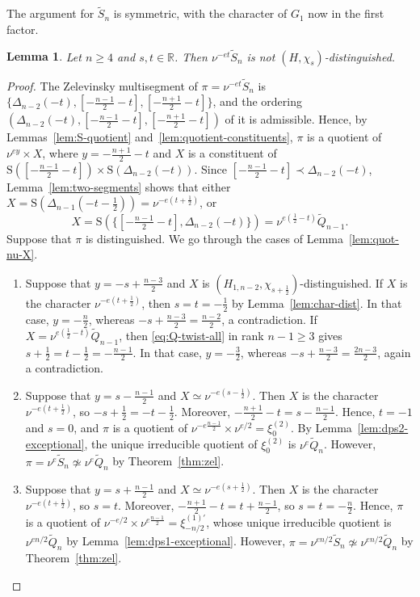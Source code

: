 \documentclass[11pt]{amsart}
\numberwithin{equation}{section}
\theoremstyle{plain}
\newtheorem{lemma}[theorem]{Lemma}
\theoremstyle{definition}
\theoremstyle{remark}
\newcommand{\R}{\mathbb{R}}
\newcommand{\Qt}{\widetilde{Q}}
\newcommand{\Stil}{\widetilde{S}}
\newcommand{\xitwo}{\xi^{(2)}}
\newcommand{\Ss}{\mathrm{S}}
\begin{document}
The argument for $\Stil_n$ is symmetric, with the character of $G_1$ now in the first factor.

\begin{lemma}\label{lem:Stn-not-dist}
	Let $n\ge4$ and $s,t\in\R$. Then $\nu^{-et}\Stil_n$ is not $(H,\chi_s)$-distinguished.
\end{lemma}

\begin{proof}
	The Zelevinsky multisegment of $\pi=\nu^{-et}\Stil_n$ is $\{\Delta_{n-2}(-t),[-\frac{n-1}2-t],[-\frac{n+1}2-t]\}$, and the ordering $(\Delta_{n-2}(-t),[-\frac{n-1}2-t],[-\frac{n+1}2-t])$ of it is admissible. Hence, by Lemmas~\ref{lem:S-quotient} and~\ref{lem:quotient-constituents}, $\pi$ is a quotient of $\nu^{ey}\times X$, where $y=-\frac{n+1}2-t$ and $X$ is a constituent of $\Ss([-\frac{n-1}2-t])\times\Ss(\Delta_{n-2}(-t))$. Since $[-\frac{n-1}2-t]\prec\Delta_{n-2}(-t)$, Lemma~\ref{lem:two-segments} shows that either $X=\Ss(\Delta_{n-1}(-t-\frac12))=\nu^{-e(t+\frac12)}$, or
	$$X=\Ss(\{[-\tfrac{n-1}2-t],\Delta_{n-2}(-t)\})=\nu^{e(\frac12-t)}\Qt_{n-1}.$$
	Suppose that $\pi$ is distinguished. We go through the cases of Lemma~\ref{lem:quot-nu-X}.
	\begin{enumerate}[label=(\alph*)]
		\item Suppose that $y=-s+\frac{n-3}2$ and $X$ is $(H_{1,n-2},\chi_{s+\frac12})$-distinguished. If $X$ is the character $\nu^{-e(t+\frac12)}$, then $s=t=-\frac12$ by Lemma~\ref{lem:char-dist}. In that case, $y=-\frac n2$, whereas $-s+\frac{n-3}2=\frac{n-2}2$, a contradiction. If $X=\nu^{e(\frac12-t)}\Qt_{n-1}$, then \eqref{eq:Q-twist-all} in rank $n-1\ge3$ gives $s+\frac12=t-\frac12=-\frac{n-1}2$. In that case, $y=-\frac32$, whereas $-s+\frac{n-3}2=\frac{2n-3}2$, again a contradiction.
		\item Suppose that $y=s-\frac{n-1}2$ and $X\simeq\nu^{-e(s-\frac12)}$. Then $X$ is the character $\nu^{-e(t+\frac12)}$, so $-s+\frac12=-t-\frac12$. Moreover, $-\frac{n+1}2-t=s-\frac{n-1}2$. Hence, $t=-1$ and $s=0$, and $\pi$ is a quotient of $\nu^{-e\frac{n-1}2}\times\nu^{e/2}=\xitwo_0$. By Lemma~\ref{lem:dps2-exceptional}, the unique irreducible quotient of $\xitwo_0$ is $\nu^e\Qt_n$. However, $\pi=\nu^e\Stil_n\not\simeq\nu^e\Qt_n$ by Theorem~\ref{thm:zel}.
		\item Suppose that $y=s+\frac{n-1}2$ and $X\simeq\nu^{-e(s+\frac12)}$. Then $X$ is the character $\nu^{-e(t+\frac12)}$, so $s=t$. Moreover, $-\frac{n+1}2-t=t+\frac{n-1}2$, so $s=t=-\frac n2$. Hence, $\pi$ is a quotient of $\nu^{-e/2}\times\nu^{e\frac{n-1}2}=\xi^{(1)\prime}_{-n/2}$, whose unique irreducible quotient is $\nu^{en/2}\Qt_n$ by Lemma~\ref{lem:dps1-exceptional}. However, $\pi=\nu^{en/2}\Stil_n\not\simeq\nu^{en/2}\Qt_n$ by Theorem~\ref{thm:zel}.

\end{enumerate}
\end{proof}
\end{document}
